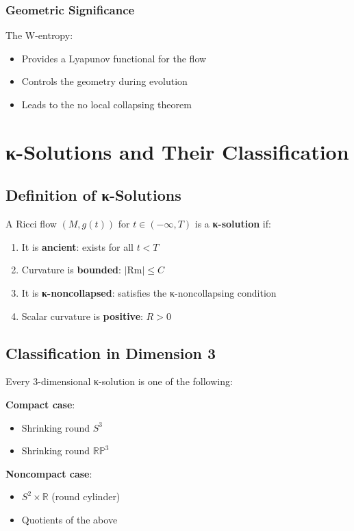 \subsection{Geometric Significance}

The W-entropy:
\begin{itemize}
\item Provides a Lyapunov functional for the flow
\item Controls the geometry during evolution
\item Leads to the no local collapsing theorem
\end{itemize}

\chapter{κ-Solutions and Their Classification}
\label{chap:kappa_solutions}

\section{Definition of κ-Solutions}

\begin{definition}[κ-Solution]
\label{def:kappa_solution}
A Ricci flow $(M, g(t))$ for $t \in (-\infty, T)$ is a \textbf{κ-solution} if:
\begin{enumerate}
\item It is \textbf{ancient}: exists for all $t < T$
\item Curvature is \textbf{bounded}: $|\text{Rm}| \leq C$ 
\item It is \textbf{κ-noncollapsed}: satisfies the κ-noncollapsing condition
\item Scalar curvature is \textbf{positive}: $R > 0$
\end{enumerate}
\end{definition}

\section{Classification in Dimension 3}

\begin{theorem}
\label{thm:kappa_classification}
Every 3-dimensional κ-solution is one of the following:

\textbf{Compact case}:
\begin{itemize}
\item Shrinking round $S^3$
\item Shrinking round $\mathbb{RP}^3$
\end{itemize}

\textbf{Noncompact case}:
\begin{itemize}
\item $S^2 \times \mathbb{R}$ (round cylinder)
\item Quotients of the above
\end{itemize}
\end{theorem}

